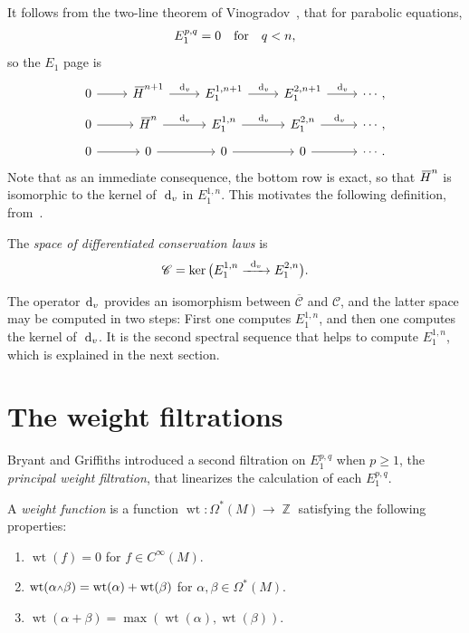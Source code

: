 \documentclass[pdftex]{sigma}
\DeclareMathOperator{\Z}{\mathbb{Z}}
\renewcommand{\d}{{\rm d}}
\newcommand{\w}{{\mathchoice{\,{\scriptstyle\wedge}\,}{{\scriptstyle\wedge}}
 {{\scriptscriptstyle\wedge}}{{\scriptscriptstyle\wedge}}}}
\DeclareMathOperator{\wt}{\mathrm{wt}}
\newcommand{\dv}{\ensuremath{\hspace{1pt} \d_v}}
\newcommand{\barh}[1]{{}\mkern3mu\overline{\mkern-3mu H}^{#1}}
\newcommand{\cMinfty}{C^\infty(M)}
\numberwithin{equation}{section}
\begin{document}
It follows from the two-line theorem of Vinogradov~\cite{Vinogradov}, that for parabolic equations,
\begin{gather*}
E^{p,q}_1 = 0 \text{\quad for\quad } q < n ,
\end{gather*}
so the $E_1$ page is
\begin{equation*}
 {\begin{tikzcd}
 0 \ar[r] & {\barh{n+1}} \ar[r, "\dv"] & {E^{1,n+1}_1} \ar[r, "\dv"] & {E^{2,n+1}_1} \ar[r, "\dv"] & \cdots ,
 \\[-3ex]
 0 \ar[r] & {\barh{n}} \ar[r, "\dv"] & {E^{1,n}_1} \ar[r, "\dv"] & {E^{2,n}_1} \ar[r, "\dv"] & \cdots ,
 \\[-3ex]
 0 \ar[r] & 0 \ar[r] & 0 \ar[r] & 0 \ar[r] & \cdots.
 \end{tikzcd}}
\end{equation*}
Note that as an immediate consequence, the bottom row is exact, so that $\barh{n}$ is isomorphic to the kernel of~$\dv$ in $E^{1,n}_1$. This motivates the following definition, from~\cite{Characteristic_Cohomology_I}.
\begin{Definition}
 The \emph{space of differentiated conservation laws} is
 \begin{gather*}
 \mathscr{C} = \ker\big(E^{1,n}_1 \xrightarrow{\ \dv\ } E^{2,n}_1\big) .
 \end{gather*}
\end{Definition}
The operator $\dv$ provides an isomorphism between $\overline{\mathscr{C}}$ and $\mathscr{C}$, and the latter space may be computed in two steps: First one computes $E^{1,n}_1$, and then one computes the kernel of~$\dv$. It is the second spectral sequence that helps to compute $E_1^{1,n}$, which is explained in the next section.

\section{The weight filtrations}\label{sec:weight filtrations}

Bryant and Griffiths introduced a second filtration on $E_1^{p,q}$ when $p\ge 1$, the \emph{principal weight filtration}, that linearizes the calculation of each $E^{p,q}_1$.

\begin{Definition}
 A \emph{weight function} is a function $\wt\colon \Omega^*(M) \to \Z$ satisfying the following properties:
 \begin{enumerate}\itemsep=0pt
 \item $\wt(f) = 0$ for $f \in \cMinfty$.
 \item $\wt(\alpha\w\beta) = \wt(\alpha) + \wt(\beta)$ for $\alpha,\beta \in \Omega^*(M)$.
 \item $\wt(\alpha + \beta) = \max(\wt(\alpha),\wt(\beta))$.
 \end{enumerate}
\end{Definition}
\end{document}

